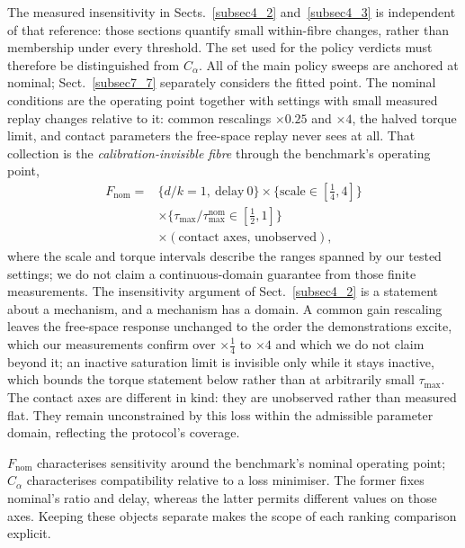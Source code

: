 \documentclass[pdflatex,iicol,sn-apa]{sn-jnl}
\theoremstyle{remark}
\begin{document}
The measured insensitivity in Sects.~\ref{subsec4_2} and~\ref{subsec4_3} is independent of that
reference: those sections quantify small within-fibre changes, rather than membership under every
threshold. The set used for the policy verdicts must therefore be distinguished from $C_\alpha$. All
of the main policy sweeps are anchored at nominal; Sect.~\ref{subsec7_7} separately considers the
fitted point. The nominal conditions are the operating point together with
settings with small measured replay changes relative to it: common rescalings
$\times 0.25$ and $\times 4$, the halved torque limit, and contact parameters the free-space replay
never sees at all. That collection is the \emph{calibration-invisible fibre} through the benchmark's
operating point,
\begin{equation}\label{eq:cset2}
\begin{split}
F_{\mathrm{nom}} = {}
  &\{d/k = 1,\ \text{delay}\ 0\}
   \times \{\text{scale} \in [\tfrac14, 4]\} \\[-2pt]
  &\times \{\tau_{\max}/\tau_{\max}^{\mathrm{nom}} \in [\tfrac12, 1]\} \\[-2pt]
  &\times (\text{contact axes, unobserved}),
\end{split}
\end{equation}
where the scale and torque intervals describe the ranges spanned by our tested settings; we do not
claim a continuous-domain guarantee from those finite measurements. The insensitivity argument of
Sect.~\ref{subsec4_2} is a statement about a mechanism, and a mechanism has a domain. A common gain
rescaling leaves the free-space response unchanged to the order the demonstrations excite, which our
measurements confirm over $\times \tfrac14$ to $\times 4$ and which we do not claim beyond it; an
inactive saturation limit is invisible only while it stays inactive, which bounds the torque
statement below rather than at arbitrarily small $\tau_{\max}$. The contact axes are different in
kind: they are unobserved rather than measured flat. They remain unconstrained by this loss within the
admissible parameter domain, reflecting
the protocol's coverage.

$F_{\mathrm{nom}}$ characterises sensitivity around the benchmark's nominal operating point;
$C_\alpha$ characterises compatibility relative to a loss minimiser. The former fixes nominal's
ratio and delay, whereas the latter permits different values on those axes. Keeping these objects
separate makes the scope of each ranking comparison explicit.
\end{document}
